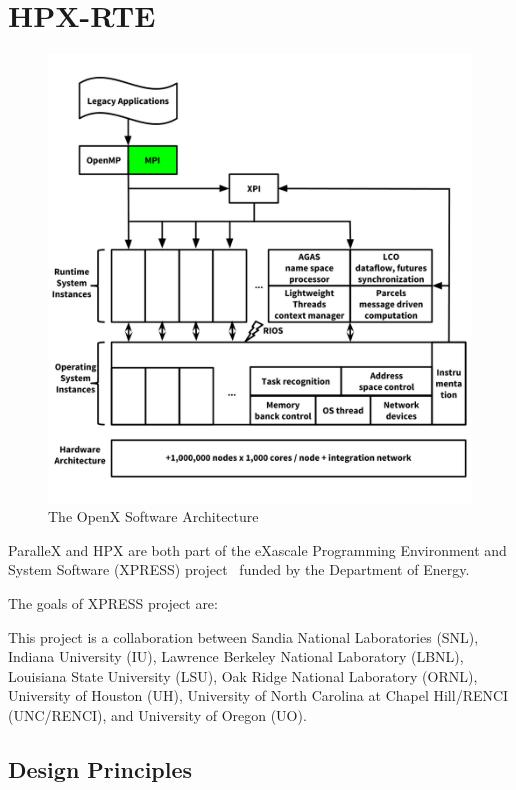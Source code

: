 \chapter{HPX-RTE}
\label{sec:HPX-RTE}


\begin{figure}[h!]
\centering
\includegraphics[scale=0.8]{images/openx.png}
\caption[The OpenX Software Architecture]{The OpenX Software Architecture}
\label{fig:openx}
\end{figure}

ParalleX and HPX are both part of the eXascale Programming Environment and System Software (XPRESS) project~\cite{huck2013early,brightwell2013xpress} funded by the Department of Energy.

The goals of XPRESS project are:


This project is a collaboration between Sandia National Laboratories (SNL), Indiana University (IU), Lawrence Berkeley National Laboratory (LBNL), Louisiana State University (LSU), Oak Ridge National Laboratory (ORNL), University of Houston (UH), University of North Carolina at Chapel Hill/RENCI (UNC/RENCI), and University of Oregon (UO).
\section{Design Principles}
\label{sec:design}

